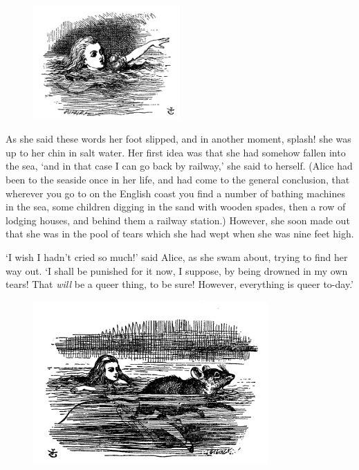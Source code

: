 \documentclass[12pt,openany]{memoir}
\begin{document}
\begin{figure}
  \includegraphics[width=0.5\textwidth]{illustrations/pic_07.jpg}
\end{figure}

As she said these words her foot slipped, and in another moment, splash! she was up to her chin in salt water. Her first idea was that she had somehow fallen into the sea, `and in that case I can go back by railway,' she said to herself. (Alice had been to the seaside once in her life, and had come to the general conclusion, that wherever you go to on the English coast you find a number of bathing machines in the sea, some children digging in the sand with wooden spades, then a row of lodging houses, and behind them a railway station.) However, she soon made out that she was in the pool of tears which she had wept when she was nine feet high.

`I wish I hadn't cried so much!' said Alice, as she swam about, trying to find her way out. `I shall be punished for it now, I suppose, by being drowned in my own tears! That \textit{will} be a queer thing, to be sure! However, everything is queer to-day.'

\begin{figure}[b]
  \centering
  \includegraphics[width=0.8\textwidth]{illustrations/pic_08.jpg}
\end{figure}
\end{document}
